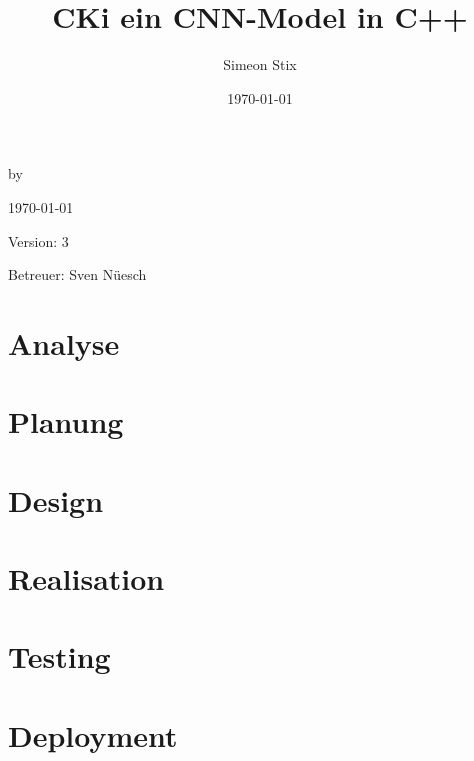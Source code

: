 \documentclass[a4paper,oneside,12pt]{report}
\title{CKi ein CNN-Model in C++}
\author{Simeon Stix}
\date{\today}
\renewcommand{\maketitle}{
\begin{titlepage}
    \begin{center}
        \vspace*{1cm}
        
        \Huge
        \textbf{\thetitle}
        
        \vspace{0.5cm}
        \Large
        by \theauthor
        
        \vspace{1.5cm}
        
        \today
        
        \vfill
        
        Version: 3
        
        \vspace{1cm}
        
        Betreuer: Sven Nüesch
        
    \end{center}
\end{titlepage}
}
\begin{document}
\maketitle

\pagestyle{plain} %

\tableofcontents %
\setcounter{secnumdepth}{3} %
\setcounter{tocdepth}{3} %

\chapter{Analyse}
\label{sec:Analyse}


\chapter{Planung}
\label{sec:Planung}


\chapter{Design}
\label{sec:Design}


\chapter{Realisation}
\label{sec:Realisation}


\chapter{Testing}
\label{sec:Testing}


\chapter{Deployment}
\label{sec:Deployment}



\clearpage
{}
\nocite{*} %
\end{document}
